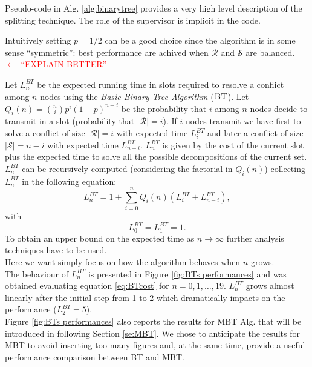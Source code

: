 \documentclass[11pt,a4paper,twoside,openright]{book}
\newcommand{\rev}[1]{\textcolor{Cerulean}{#1}}
\newcommand{\algname}[1]{\ensuremath{\mbox{\sc #1}}}
\begin{document}
\rev{Pseudo-code in Alg. \ref{alg:binarytree} provides a very high level description of the splitting technique. The role of the supervisor is implicit in the code.\\}

\rev{Intuitively setting $p=1/2$ can be a good choice since the algorithm is in some sense ``symmetric'':  best performance are achived when $\mathcal{R}$ and $\mathcal{S}$ are balanced. \textcolor{red}{$\leftarrow$ ``EXPLAIN BETTER''}\\}


Let $L_{n}^{BT}$ be the expected running time in slots required to resolve a conflict among $n$ nodes using the \emph{Basic Binary Tree Algorithm} (\algname{BT}).
Let $Q_{i}(n)={n\choose i} p^{i} (1-p)^{n-i}$ be the probability that $i$ among $n$ nodes decide to transmit in a slot (probability that $|\mathcal{R}|=i$). If $i$ nodes transmit we have first to solve a conflict of size $|\mathcal{R}|=i$ with expected time $L_{i}^{BT}$ and later a conflict of size $|\mathcal{S}|=n-i$ with expected time $L_{n-i}^{BT}$. $L_{n}^{BT}$ is given by the cost of the current slot plus the expected time to solve all the possible decompositions of the current set.\\
$L_{n}^{BT}$ can be recursively computed (considering the factorial in $Q_{i}(n)$) collecting  $L_{n}^{BT}$ in the following equation:
\begin{equation}
\label{eq:BTcost}
L_{n}^{BT} = 1 + \sum_{i=0}^{n} Q_{i}(n) (L_{i}^{BT}+L_{n-i}^{BT}),
\end{equation}
with
\begin{equation*}
L_{0}^{BT} = L_{1}^{BT}  = 1.
\end{equation*}
To obtain an upper bound on the expected time as $ n \to \infty$ further analysis techniques have to be used.\\
Here we want simply focus on how the algorithm behaves when $n$ grows.\\

\rev{The behaviour of $L_{n}^{BT}$ is presented in Figure \ref{fig:BTs performances} and was obtained evaluating  equation \eqref{eq:BTcost} for $n=0,1,\ldots,19$. $L_{n}^{BT}$ grows almost linearly after the initial step from 1 to 2 which dramatically impacts on the performance ($L_{2}^{BT}=5$).\\ Figure \ref{fig:BTs performances} also reports the results for MBT Alg. that will be introduced in following Section \ref{se:MBT}. We chose to anticipate the results for MBT to avoid inserting too many figures and, at the same time, provide a useful performance comparison between BT and MBT.} 
\end{document}
